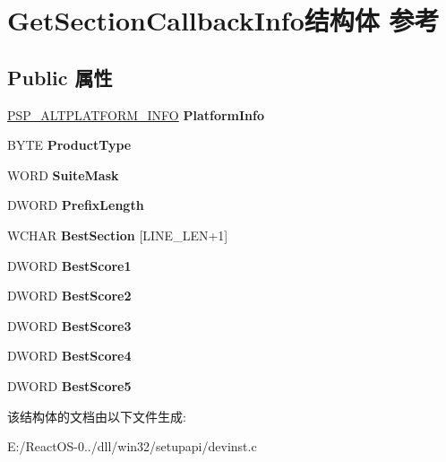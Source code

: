 \hypertarget{struct_get_section_callback_info}{}\section{Get\+Section\+Callback\+Info结构体 参考}
\label{struct_get_section_callback_info}
\subsection*{Public 属性}
\begin{DoxyCompactItemize}
\item 
\mbox{\label{struct_get_section_callback_info_a56e19b62bb2d8c10bebab5c94cf029c5}} 
\hyperlink{struct___s_p___a_l_t_p_l_a_t_f_o_r_m___i_n_f_o___v1}{P\+S\+P\+\_\+\+A\+L\+T\+P\+L\+A\+T\+F\+O\+R\+M\+\_\+\+I\+N\+FO} {\bfseries Platform\+Info}
\item 
\mbox{\label{struct_get_section_callback_info_a185bd7a2a28cd5dcabf32cfc4a5f43a8}} 
B\+Y\+TE {\bfseries Product\+Type}
\item 
\mbox{\label{struct_get_section_callback_info_a15dc9c7ae5757e0e2269ece9788a2000}} 
W\+O\+RD {\bfseries Suite\+Mask}
\item 
\mbox{\label{struct_get_section_callback_info_a5da244cede98d03a1be61dddac93bb82}} 
D\+W\+O\+RD {\bfseries Prefix\+Length}
\item 
\mbox{\label{struct_get_section_callback_info_a3c7d07e3f6e01e4bd78206af925562b0}} 
W\+C\+H\+AR {\bfseries Best\+Section} \mbox{[}L\+I\+N\+E\+\_\+\+L\+EN+1\mbox{]}
\item 
\mbox{\label{struct_get_section_callback_info_a8e11c0a6037be58151e772289dc266d6}} 
D\+W\+O\+RD {\bfseries Best\+Score1}
\item 
\mbox{\label{struct_get_section_callback_info_a50850a0febef6913f294b5df2a7145d1}} 
D\+W\+O\+RD {\bfseries Best\+Score2}
\item 
\mbox{\label{struct_get_section_callback_info_a3ba29aa7ccf04ad0d2cccce4b9e117ed}} 
D\+W\+O\+RD {\bfseries Best\+Score3}
\item 
\mbox{\label{struct_get_section_callback_info_a521fb3d91fc2be2fec3a3945b5d14118}} 
D\+W\+O\+RD {\bfseries Best\+Score4}
\item 
\mbox{\label{struct_get_section_callback_info_a376a8609535dee538761c3be89821ddf}} 
D\+W\+O\+RD {\bfseries Best\+Score5}
\end{DoxyCompactItemize}


该结构体的文档由以下文件生成\+:\begin{DoxyCompactItemize}
\item 
E\+:/\+React\+O\+S-\/0../dll/win32/setupapi/devinst.\+c\end{DoxyCompactItemize}
